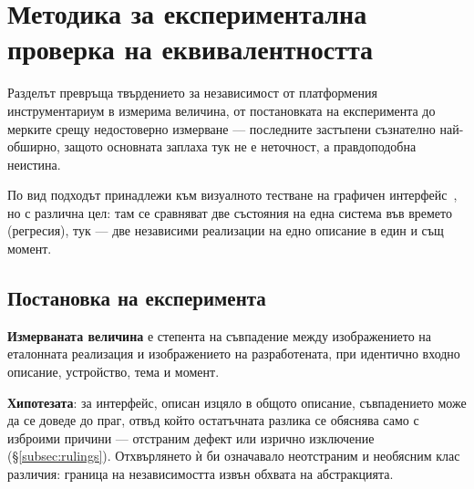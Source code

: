 %
%
\section{Методика за експериментална проверка на еквивалентността}
\label{sec:method}

Разделът превръща твърдението за независимост от платформения инструментариум в
измерима величина, от постановката на експеримента до мерките срещу недостоверно
измерване --- последните застъпени съзнателно най-обширно, защото основната заплаха
тук не е неточност, а правдоподобна неистина.

По вид подходът принадлежи към визуалното тестване на графичен
интерфейс~\cite{garousi2017vgt}, но с различна цел: там се сравняват две състояния на
една система във времето (регресия), тук --- две независими реализации на едно
описание в един и същ момент.

\subsection{Постановка на експеримента}
\label{subsec:exp_setup}

\textbf{Измерваната величина} е степента на съвпадение между изображението на
еталонната реализация и изображението на разработената, при идентично входно описание,
устройство, тема и момент.

\textbf{Хипотезата}: за интерфейс, описан изцяло в общото описание, съвпадението може
да се доведе до праг, отвъд който остатъчната разлика се обяснява само с изброими
причини --- отстраним дефект или изрично изключение (§\ref{subsec:rulings}).
Отхвърлянето ѝ би означавало неотстраним и необясним клас различия: граница на
независимостта извън обхвата на абстракцията.

